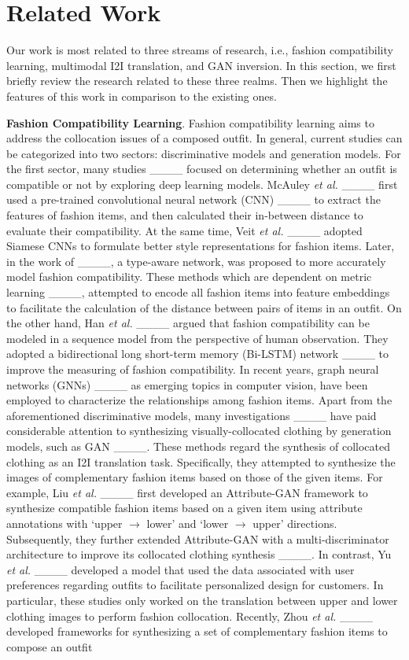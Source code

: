 \section{Related Work}
\label{related_work}
	
	Our work is most related to three streams of research, i.e., fashion compatibility learning, multimodal I2I translation, and GAN inversion. In this section, we first briefly review the research related to these three realms. Then we highlight the features of this work in comparison to the existing ones.
	
	\textbf{Fashion Compatibility Learning}. Fashion compatibility learning aims to address the collocation issues of a composed outfit. In general, current studies can be categorized into two sectors: discriminative models and generation models. For the first sector, many studies ____ focused on determining whether an outfit is compatible or not by exploring deep learning models. McAuley \textit{et al.} ____ first used a pre-trained convolutional neural network (CNN) ____ to extract the features of fashion items, and then calculated their in-between distance to evaluate their compatibility. At the same time, Veit \textit{et al.} ____ adopted Siamese CNNs to formulate better style representations for fashion items. Later, in the work of ____, a type-aware network, was proposed to more accurately model fashion compatibility. These methods which are dependent on metric learning ____, attempted to encode all fashion items into feature embeddings to facilitate the calculation of the distance between pairs of items in an outfit. On the other hand, Han \textit{et al.} ____ argued that fashion compatibility can be modeled in a sequence model from the perspective of human observation. They adopted a bidirectional long short-term memory (Bi-LSTM) network ____ to improve the measuring of fashion compatibility. In recent years, graph neural networks (GNNs) ____ as emerging topics in computer vision, have been employed to characterize the relationships among fashion items. Apart from the aforementioned discriminative models, many investigations ____ have paid considerable attention to synthesizing visually-collocated clothing by generation models, such as GAN ____. These methods regard the synthesis of collocated clothing as an I2I translation task. Specifically, they attempted to synthesize the images of complementary fashion items based on those of the given items. For example, Liu \textit{et al.} ____ first developed an Attribute-GAN framework to synthesize compatible fashion items based on a given item using attribute annotations with `upper $\rightarrow$ lower' and `lower $\rightarrow$ upper' directions. Subsequently, they further extended Attribute-GAN with a multi-discriminator architecture to improve its collocated clothing synthesis ____. In contrast, Yu \textit{et al.} ____ developed a model that used the data associated with user preferences regarding outfits to facilitate personalized design for customers. In particular, these studies only worked on the translation between upper and lower clothing images to perform fashion collocation. Recently, Zhou \textit{et al.} ____ developed frameworks for synthesizing a set of complementary fashion items to compose an outfit 